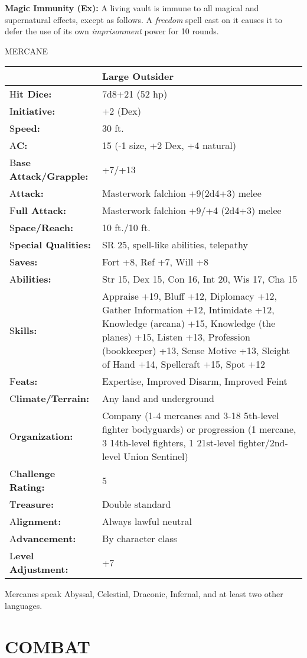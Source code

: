 \documentclass{article}
\begin{document}
{\textbf{Magic Immunity (Ex):} A living vault is immune to all magical and supernatural 
effects, except as follows. A \textit{freedom }spell cast on it causes it to defer 
the use of its own \textit{imprisonment }power for 10 rounds. 

\vspace{12pt}
{\LARGE{}MERCANE }

\begin{tabular}{|>{\raggedright}p{66pt}|>{\raggedright}p{259pt}|}
\hline
  & Large Outsider\tabularnewline
\hline
H\textbf{it Dice:} & 7d8+21 (52 hp) \tabularnewline
\hline
I\textbf{nitiative:} & +2 (Dex) \tabularnewline
\hline
S\textbf{peed:} & 30 ft. \tabularnewline
\hline
A\textbf{C:} & 15 (-1 size, +2 Dex, +4 natural) \tabularnewline
\hline
B\textbf{ase Attack/Grapple:} & +7/+13\tabularnewline
\hline
A\textbf{ttack:} & Masterwork falchion +9(2d4+3) melee\tabularnewline
\hline
F\textbf{ull Attack:} & Masterwork falchion +9/+4 (2d4+3) melee\textbf{ }\tabularnewline
\hline
S\textbf{pace/Reach:} & 10 ft./10 ft. \tabularnewline
\hline
S\textbf{pecial Qualities:} & SR 25, spell-like abilities, telepathy\tabularnewline
\hline
S\textbf{aves:} & Fort +8, Ref +7, Will +8 \tabularnewline
\hline
A\textbf{bilities:} & Str 15, Dex 15, Con 16, Int 20, Wis 17, Cha 15 \tabularnewline
\hline
S\textbf{kills:} & Appraise +19, Bluff +12, Diplomacy +12, Gather Information +12, 
Intimidate +12, Knowledge (arcana) +15, Knowledge (the planes) +15, Listen +13, 
Profession (bookkeeper) +13, Sense Motive +13, Sleight of Hand +14, Spellcraft 
+15, Spot +12 \tabularnewline
\hline
F\textbf{eats:} & Expertise, Improved Disarm, Improved Feint\tabularnewline
\hline
C\textbf{limate/Terrain:} & Any land and underground \tabularnewline
\hline
O\textbf{rganization:} & Company (1-4 mercanes and 3-18 5th-level fighter bodyguards) 
or progression (1 mercane, 3 14th-level fighters, 1 21st-level fighter/2nd-level 
Union Sentinel) \tabularnewline
\hline
C\textbf{hallenge Rating:} & 5 \tabularnewline
\hline
T\textbf{reasure:} & Double standard \tabularnewline
\hline
A\textbf{lignment:} & Always lawful neutral \tabularnewline
\hline
A\textbf{dvancement:} & By character class \tabularnewline
\hline
L\textbf{evel Adjustment:} & +7\tabularnewline
\hline
\end{tabular}

\vspace{12pt}
Mercanes speak Abyssal, Celestial, Draconic, Infernal, and at least two other languages. 

\section*{COMBAT }

}
\end{document}
